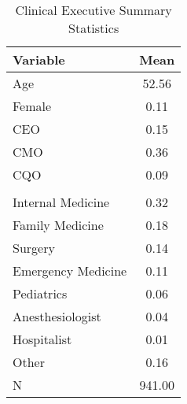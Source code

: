 \begin{table}[ht!]
\centering
\caption{\label{doc_sumstats}Clinical Executive Summary Statistics}
\centering
\begin{tabular}[t]{lc}
\toprule
Variable & Mean\\
\midrule
Age & 52.56\\
Female & 0.11\\
CEO & 0.15\\
CMO & 0.36\\
CQO & 0.09\\
\addlinespace[0.3em]
\multicolumn{2}{l}{\textbf{Specialty}}\\
\hspace{1em}Internal Medicine & 0.32\\
\hspace{1em}Family Medicine & 0.18\\
\hspace{1em}Surgery & 0.14\\
\hspace{1em}Emergency Medicine & 0.11\\
\hspace{1em}Pediatrics & 0.06\\
\hspace{1em}Anesthesiologist & 0.04\\
\hspace{1em}Hospitalist & 0.01\\
\hspace{1em}Other & 0.16\\
N & 941.00\\
\bottomrule
\end{tabular}
\end{table}
